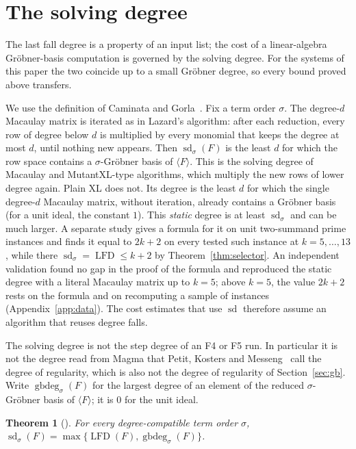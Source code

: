 \documentclass[11pt]{article}
\newtheorem{theorem}{Theorem}
\theoremstyle{definition}\newtheorem{definition}[theorem]{Definition}
\theoremstyle{remark}\newtheorem{remark}[theorem]{Remark}
\newcommand{\lfd}{\operatorname{LFD}}
\newcommand{\sd}{\operatorname{sd}}
\newcommand{\gbdeg}{\operatorname{gbdeg}}
\newcommand{\Id}{\langle F\rangle}
\begin{document}
\section{The solving degree}\label{sec:solving}
The last fall degree is a property of an input list; the cost of a
linear-algebra Gr\"obner-basis computation is governed by the solving degree.
For the systems of this paper the two coincide up to a small Gr\"obner degree,
so every bound proved above transfers.

We use the definition of Caminata and Gorla~\cite[Def.~1.1]{cg}. Fix a term
order $\sigma$. The degree-$d$ Macaulay matrix is iterated as in Lazard's
algorithm: after each reduction, every row of degree below $d$ is
multiplied by every monomial that keeps the degree at most $d$, until
nothing new appears. Then $\sd_\sigma(F)$ is the least $d$ for which the
row space contains a $\sigma$-Gr\"obner basis of $\Id$. This is the solving
degree of Macaulay and MutantXL-type algorithms, which multiply the new
rows of lower degree again. Plain XL does not. Its degree is the least $d$
for which the single degree-$d$ Macaulay matrix, without iteration, already
contains a Gr\"obner basis (for a unit ideal, the constant $1$). This
\emph{static} degree is at least $\sd_\sigma$ and can be much larger. A
separate study gives a formula for it on unit two-summand prime instances
and finds it equal to $2k+2$ on every tested such instance at
$k=5,\ldots,13$, while there $\sd_\sigma=\lfd\le k+2$ by
Theorem~\ref{thm:selector}. An independent validation found no gap in the
proof of the formula and reproduced the static degree with a literal
Macaulay matrix up to $k=5$; above $k=5$, the value $2k+2$ rests on the
formula and on recomputing a sample of instances (Appendix~\ref{app:data}).
The cost estimates that use $\sd$ therefore assume an algorithm that reuses
degree falls.

The solving degree is not the step degree of an F4 or F5 run. In
particular it is not the degree read from Magma that Petit, Kosters and
Messeng~\cite{pkm} call the degree of regularity, which is also not the
degree of regularity of Section~\ref{sec:gb}. Write $\gbdeg_\sigma(F)$ for
the largest degree of an element of the reduced $\sigma$-Gr\"obner basis of
$\Id$; it is $0$ for the unit ideal.

\begin{theorem}[{\cite[Thm.~3.1]{cg}}]\label{thm:cg}
For every degree-compatible term order $\sigma$,
$\sd_\sigma(F)=\max\{\lfd(F),\gbdeg_\sigma(F)\}$.
\end{theorem}
\end{document}
